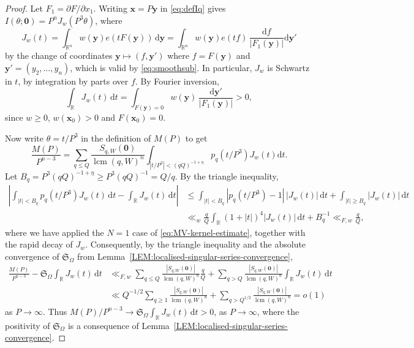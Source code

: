 \documentclass[a4paper,11pt, twoside,reqno]{amsart}
\theoremstyle{plain}
\theoremstyle{definition}
\theoremstyle{remark}
\newcommand{\bfx}{\bm{x}}
\newcommand{\bfy}{\bm{y}}
\newcommand{\RR}{\mathbb{R}}
\newcommand{\dd}{\mathrm{d}}
\renewcommand{\le}{\leqslant}
\renewcommand{\ge}{\geqslant}
\newcommand{\lcm}{\operatorname{lcm}}
\numberwithin{equation}{section}
\begin{document}
\begin{proof}
Let $F_1 = \partial F/\partial x_1$.
Writing $\bfx=P\bfy$ in \eqref{eq:defIq} gives
$I(\theta;\bm0)=P^n J_w(P^3\theta)$, where
\begin{equation*}
J_w(t) = \int_{\RR^n} w(\bfy)e(tF(\bfy))\,\dd\bfy
= \int_{\RR^n} w(\bfy)e(tf)\,\frac{\dd f}{|F_1(\bfy)|} \dd\bfy'
\end{equation*}
by the change of coordinates $\bfy\mapsto (f,\bfy')$
where $f = F(\bfy)$ and $\bfy' = (y_2,\dots,y_n)$,
which is valid by \eqref{eq:smoothsub}.
In particular, $J_w$ is Schwartz in $t$, by integration by parts over $f$.
By Fourier inversion,
\begin{equation*}
\int_{\RR} J_w(t) \,\dd t = \int_{F(\bfy)=0} w(\bfy)\,\frac{\dd\bfy'}{|F_1(\bfy)|} > 0,
\end{equation*}
since $w\ge 0$, $w(\bfx_0)>0$ and $F(\bfx_0) = 0$.

Now write $\theta = t/P^3$ in the definition of $M(P)$ to get
\begin{equation*}
\frac{M(P)}{P^{n-3}}
= \sum_{q\le Q}\frac{S_{q,W}(\bm{0})}{\lcm(q,W)^n}
\int_{|t/P^3|<(qQ)^{-1+\eta}} p_q(t/P^3)
J_w(t)\dd t.
\end{equation*}
Let $B_q = P^3 (qQ)^{-1+\eta} \ge P^3 (qQ)^{-1} = Q/q$.
By the triangle inequality,
\begin{align*}
\left|\int_{|t|<B_q}p_q(t/P^3)J_w(t)\,\dd t-\int_{\RR} J_w(t) \,\dd t\right|
&\le\int_{|t|<B_q}|p_q(t/P^3)-1|\,|J_w(t)|\,\dd t
+\int_{|t|\ge B_q}|J_w(t)|\,\dd t\\
&\ll_w \frac qQ\int_{\RR}(1+|t|)^4|J_w(t)|\,\dd t+B_q^{-1}
\ll_{F,w}\frac qQ,
\end{align*}
where we have applied the $N=1$ case of \eqref{eq:MV-kernel-estimate},
together with the rapid decay of $J_w$.
Consequently, by the triangle inequality
and the absolute convergence of $\mathfrak S_\Omega$
from Lemma~\ref{LEM:localised-singular-series-convergence},
\begin{align*}
\frac{M(P)}{P^{n-3}}-\mathfrak S_\Omega \int_{\RR} J_w(t) \,\dd t
&\ll_{F,w}\sum_{q\le Q}\frac{|S_{q,W}(\bm{0})|}{\lcm(q,W)^n} \frac qQ
+\sum_{q>Q} \frac{|S_{q,W}(\bm{0})|}{\lcm(q,W)^n} \int_{\RR} J_w(t) \,\dd t \\
& \ll Q^{-1/2} \sum_{q\ge 1} \frac{|S_{q,W}(\bm{0})|}{\lcm(q,W)^n}
+ \sum_{q>Q^{1/2}} \frac{|S_{q,W}(\bm{0})|}{\lcm(q,W)^n} = o(1)
\end{align*}
as $P\to \infty$.
Thus $M(P)/P^{n-3} \to \mathfrak S_\Omega \int_{\RR} J_w(t) \,\dd t > 0$,
as $P\to \infty$, where the positivity of $\mathfrak{S}_\Omega$ is a consequence of Lemma~\ref{LEM:localised-singular-series-convergence}.
\end{proof}
\end{document}

